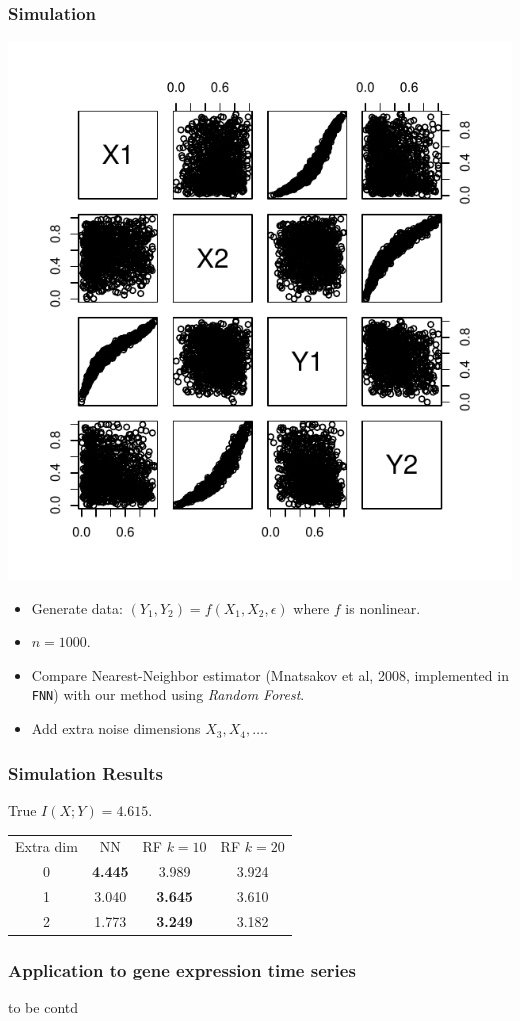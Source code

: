 \documentclass{beamer}
\begin{document}
\begin{frame}
\frametitle{Simulation}


\begin{center}
\includegraphics[scale = 0.34]{../idloss/sim1_pairs.pdf}
\end{center}
\begin{itemize}
\item Generate data: $(Y_1, Y_2) = f(X_1, X_2, \epsilon)$ where $f$ is nonlinear.
\item $n = 1000$.
\item Compare Nearest-Neighbor estimator (Mnatsakov et al, 2008, implemented in {\tt FNN}) with our method using \emph{Random Forest}.
\item Add extra noise dimensions $X_3, X_4, \hdots$.
\end{itemize}


\end{frame}

\begin{frame}
\frametitle{Simulation Results}

True $I(X; Y) = 4.615$.

\begin{center}
\begin{tabular}{c||c|c|c}
Extra dim & NN & RF $k = 10$ & RF $k=20$\\
0 & \textbf{4.445} & 3.989 & 3.924\\
1 & 3.040 & \textbf{3.645} & 3.610\\
2 & 1.773 & \textbf{3.249} & 3.182
\end{tabular}
\end{center}


\end{frame}

\begin{frame}
\frametitle{Application to gene expression time series}
to be contd
\end{frame}
\end{document}
